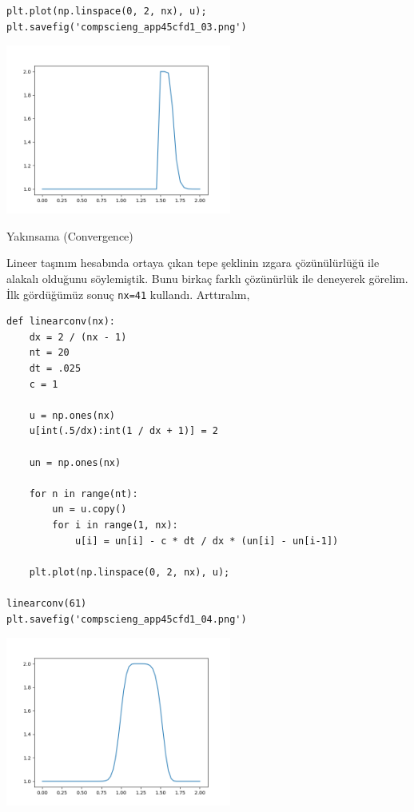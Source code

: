 \documentclass[12pt,fleqn]{article}\usepackage{../../common}
\begin{document}
\begin{verbatim}
plt.plot(np.linspace(0, 2, nx), u);
plt.savefig('compscieng_app45cfd1_03.png')
\end{verbatim}

\includegraphics[width=20em]{compscieng_app45cfd1_03.png}

Yakınsama (Convergence)

Lineer taşınım hesabında ortaya çıkan tepe şeklinin ızgara çözünülürlüğü ile
alakalı olduğunu söylemiştik. Bunu birkaç farklı çözünürlük ile deneyerek
görelim. İlk gördüğümüz sonuç \verb!nx=41! kullandı. Arttıralım,

\begin{verbatim}
def linearconv(nx):
    dx = 2 / (nx - 1)
    nt = 20    
    dt = .025  
    c = 1

    u = np.ones(nx)
    u[int(.5/dx):int(1 / dx + 1)] = 2  

    un = np.ones(nx)

    for n in range(nt):
        un = u.copy() 
        for i in range(1, nx):
            u[i] = un[i] - c * dt / dx * (un[i] - un[i-1])
        
    plt.plot(np.linspace(0, 2, nx), u);

linearconv(61)
plt.savefig('compscieng_app45cfd1_04.png')
\end{verbatim}

\includegraphics[width=20em]{compscieng_app45cfd1_04.png}
\end{document}
